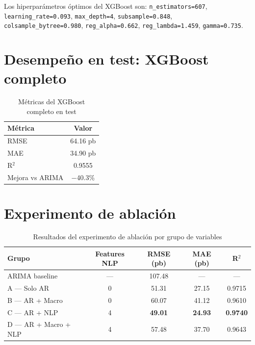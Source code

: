 
Los hiperparámetros óptimos del XGBoost son: \texttt{n\_estimators=607}, \texttt{learning\_rate=0.093},
\texttt{max\_depth=4}, \texttt{subsample=0.848}, \texttt{colsample\_bytree=0.980},
\texttt{reg\_alpha=0.662}, \texttt{reg\_lambda=1.459}, \texttt{gamma=0.735}.

\section{Desempeño en test: XGBoost completo}

\begin{table}[H]
\centering
\caption{Métricas del XGBoost completo en test}
\label{tab:xgb_test}
\begin{tabular}{lc}
\toprule
\textbf{Métrica} & \textbf{Valor} \\
\midrule
RMSE  & 64.16 pb \\
MAE   & 34.90 pb \\
R$^2$ & 0.9555   \\
Mejora vs ARIMA & $-$40.3\% \\
\bottomrule
\end{tabular}
\end{table}

\section{Experimento de ablación}


\begin{table}[H]
\centering
\caption{Resultados del experimento de ablación por grupo de variables}
\label{tab:ablation}
\begin{tabular}{lcccc}
\toprule
\textbf{Grupo} & \textbf{Features NLP} & \textbf{RMSE (pb)} & \textbf{MAE (pb)} & \textbf{R$^2$} \\
\midrule
ARIMA baseline      & ---  & 107.48 & ---   & ---    \\
A — Solo AR         & 0    & 51.31  & 27.15 & 0.9715 \\
B — AR + Macro      & 0    & 60.07  & 41.12 & 0.9610 \\
C — AR + NLP        & 4    & \textbf{49.01}  & \textbf{24.93} & \textbf{0.9740} \\
D — AR + Macro + NLP& 4    & 57.48  & 37.70 & 0.9643 \\
\bottomrule
\end{tabular}
\end{table}

